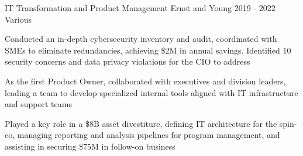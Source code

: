 \begin{cventries}
  \cventry
    {IT Transformation and Product Management} %
    {Ernst and Young} %
    {2019 - 2022} %
    {Various} %
    {
      \begin{cvitems} %
        \item {Conducted an in-depth cybersecurity inventory and audit, coordinated with SMEs to eliminate redundancies, achieving \$2M in annual savings. Identified 10 security concerns and data privacy violations for the CIO to address}
        \item {As the first Product Owner, collaborated with executives and division leaders, leading a team to develop specialized internal tools aligned with IT infrastructure and support teams}
        \item {Played a key role in a \$8B asset divestiture, defining IT architecture for the spin-co, managing reporting and analysis pipelines for program management, and assisting in securing \$75M in follow-on business}
      \end{cvitems}
    }


\end{cventries}